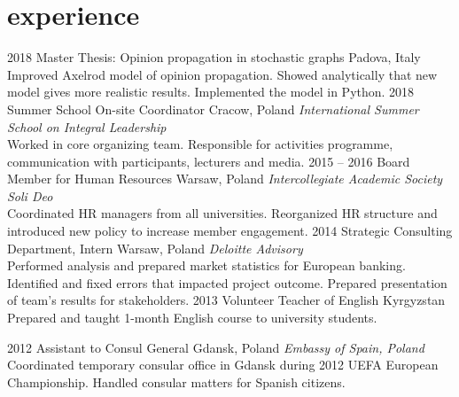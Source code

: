 \documentclass[]{appsilon} %
\begin{document}
\vspace{0cm}
\section{experience}

\begin{entrylist}
\entry
{2018}
{Master Thesis: Opinion propagation in stochastic graphs}
{Padova, Italy}
{Improved Axelrod model of opinion propagation. Showed analytically that new model gives more realistic results. Implemented the model in Python.}
\entry
{2018}
{Summer School On-site Coordinator}
{Cracow, Poland}
{\emph{International Summer School on Integral Leadership} \\
	Worked in core organizing team. Responsible for activities programme, communication with participants, lecturers and media.}
\entry
{2015 -- 2016}
{Board Member for Human Resources}
{Warsaw, Poland}
{\emph{Intercollegiate Academic Society Soli Deo} \\
Coordinated HR managers from all universities. Reorganized HR structure and introduced new policy to increase member engagement.
}
\entry
{2014}
{Strategic Consulting Department, Intern}
{Warsaw, Poland}
{\emph{Deloitte Advisory} \\
Performed analysis and prepared market statistics for European banking. Identified and fixed errors that impacted project outcome. Prepared presentation of team's results for stakeholders. }
\entry
{2013}
{Volunteer Teacher of English}
{Kyrgyzstan}
{Prepared and taught 1-month English course to university students.}

\entry
{2012}
{Assistant to Consul General}
{Gdansk, Poland}
{\emph{Embassy of Spain, Poland} \\
Coordinated temporary consular office in Gdansk during 2012 UEFA European Championship. Handled consular matters for Spanish citizens.  
}
\end{entrylist}


\end{document}
